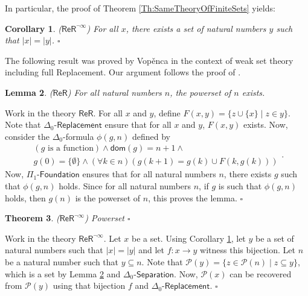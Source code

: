 \documentclass[11pt, a4paper]{article}
\newcounter{Prop1}
\newcounter{Theor1}
\newcounter{Ex1}
\newtheorem{theorem}{Theorem}[section]
\newtheorem{lemma}[theorem]{Lemma}
\newtheorem{corollary}[theorem]{Corollary}
\newenvironment{proof}[1][Proof]{\begin{trivlist}
\item[\hskip \labelsep {\bfseries #1}]}{\end{trivlist}}
\begin{document}
In particular, the proof of Theorem \ref{Th:SameTheoryOfFiniteSets} yields:

\begin{corollary} \label{Th:EverySetInBijectionWithSetOfNumbers}
($\mathsf{ReR}^{\neg \infty}$) For all $x$, there exists a set of natural numbers $y$ such that $|x|=|y|$. \hfill$\square$
\end{corollary}

The following result was proved by Vop\v{e}nca \cite{vop64} in the context of weak set theory including full \textsf{Replacement}. Our argument follows the proof of \cite[Proposition 2.13]{mat06}. 

\begin{lemma} \label{Th:PowersetsOfNumbersExist}
($\mathsf{ReR}$) For all natural numbers $n$, the powerset of $n$ exists.
\end{lemma}

\begin{proof}
Work in the theory $\mathsf{ReR}$. For all $x$ and $y$, define $F(x, y)=\{z \cup \{x\} \mid z \in y\}$. Note that $\Delta_0\textsf{-Replacement}$ ensure that for all $x$ and $y$, $F(x, y)$ exists. Now, consider the $\Delta_0$-formula $\phi(g, n)$ defined by
\[
\begin{array}{c}
(g \textrm{ is a function}) \land \mathsf{dom}(g)=n+1 \land\\
g(0)= \{\emptyset\} \land (\forall k \in n)(g(k+1)= g(k) \cup F(k, g(k)))
\end{array}.
\]
Now, $\Pi_1\textsf{-Foundation}$ ensures that for all natural numbers $n$, there exists $g$ such that $\phi(g, n)$ holds. Since for all natural numbers $n$, if $g$ is such that $\phi(g, n)$ holds, then $g(n)$ is the powerset of $n$, this proves the lemma. \hfill$\square$
\end{proof}

\begin{theorem} \label{Th:PowersetInReR}
($\mathsf{ReR}^{\neg \infty}$) \textsf{Powerset} \hfill$\square$
\end{theorem}

\begin{proof}
Work in the theory $\mathsf{ReR}^{\neg \infty}$. Let $x$ be a set. Using Corollary \ref{Th:EverySetInBijectionWithSetOfNumbers}, let $y$ be a set of natural numbers such that $|x|=|y|$ and let $f: x \longrightarrow y$ witness this bijection. Let $n$ be a natural number such that $y \subseteq n$. Note that $\mathcal{P}(y)= \{ z \in \mathcal{P}(n) \mid z \subseteq y\}$, which is a set by Lemma \ref{Th:PowersetsOfNumbersExist} and $\Delta_0\textsf{-Separation}$. Now, $\mathcal{P}(x)$ can be recovered from $\mathcal{P}(y)$ using that bijection $f$ and $\Delta_0\textsf{-Replacement}$. \hfill$\square$ 
\end{proof}
\end{document}

